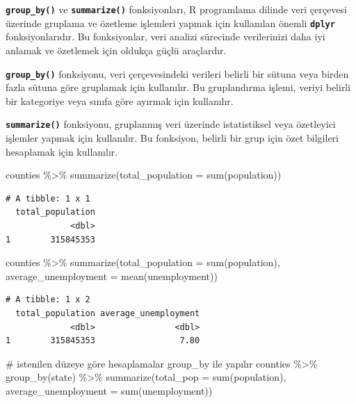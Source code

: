 \documentclass[
  letterpaper,
  DIV=11,
  numbers=noendperiod]{scrreprt}
\newenvironment{Shaded}{\begin{snugshade}}{\end{snugshade}}
\newcommand{\AttributeTok}[1]{\textcolor[rgb]{0.40,0.45,0.13}{#1}}
\newcommand{\CommentTok}[1]{\textcolor[rgb]{0.37,0.37,0.37}{#1}}
\newcommand{\FunctionTok}[1]{\textcolor[rgb]{0.28,0.35,0.67}{#1}}
\newcommand{\NormalTok}[1]{\textcolor[rgb]{0.00,0.23,0.31}{#1}}
\newcommand{\SpecialCharTok}[1]{\textcolor[rgb]{0.37,0.37,0.37}{#1}}
\begin{document}

\textbf{\texttt{group\_by()}} ve \textbf{\texttt{summarize()}}
fonksiyonları, R programlama dilinde veri çerçevesi üzerinde gruplama ve
özetleme işlemleri yapmak için kullanılan önemli \textbf{\texttt{dplyr}}
fonksiyonlarıdır. Bu fonksiyonlar, veri analizi sürecinde verilerinizi
daha iyi anlamak ve özetlemek için oldukça güçlü araçlardır.

\textbf{\texttt{group\_by()}} fonksiyonu, veri çerçevesindeki verileri
belirli bir sütuna veya birden fazla sütuna göre gruplamak için
kullanılır. Bu gruplandırma işlemi, veriyi belirli bir kategoriye veya
sınıfa göre ayırmak için kullanılır.

\textbf{\texttt{summarize()}} fonksiyonu, gruplanmış veri üzerinde
istatistiksel veya özetleyici işlemler yapmak için kullanılır. Bu
fonksiyon, belirli bir grup için özet bilgileri hesaplamak için
kullanılır.

\begin{Shaded}
\begin{Highlighting}[]
\NormalTok{counties }\SpecialCharTok{\%\textgreater{}\%}
\FunctionTok{summarize}\NormalTok{(}\AttributeTok{total\_population =} \FunctionTok{sum}\NormalTok{(population))}
\end{Highlighting}
\end{Shaded}

\begin{verbatim}
# A tibble: 1 x 1
  total_population
             <dbl>
1        315845353
\end{verbatim}

\begin{Shaded}
\begin{Highlighting}[]
\NormalTok{counties }\SpecialCharTok{\%\textgreater{}\%}
\FunctionTok{summarize}\NormalTok{(}\AttributeTok{total\_population =} \FunctionTok{sum}\NormalTok{(population),}
\AttributeTok{average\_unemployment =} \FunctionTok{mean}\NormalTok{(unemployment))}
\end{Highlighting}
\end{Shaded}

\begin{verbatim}
# A tibble: 1 x 2
  total_population average_unemployment
             <dbl>                <dbl>
1        315845353                 7.80
\end{verbatim}

\begin{Shaded}
\begin{Highlighting}[]
\CommentTok{\# istenilen düzeye göre hesaplamalar group\_by ile yapılır}
\NormalTok{counties }\SpecialCharTok{\%\textgreater{}\%}
\FunctionTok{group\_by}\NormalTok{(state) }\SpecialCharTok{\%\textgreater{}\%}
\FunctionTok{summarize}\NormalTok{(}\AttributeTok{total\_pop =} \FunctionTok{sum}\NormalTok{(population),}
\AttributeTok{average\_unemployment =} \FunctionTok{sum}\NormalTok{(unemployment))}
\end{Highlighting}
\end{Shaded}
\end{document}
